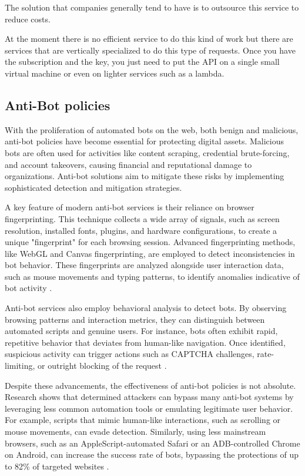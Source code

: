The solution that companies generally tend to have is to outsource this service to reduce costs.

At the moment there is no efficient service to do this kind of work but there are services that are vertically specialized to do this type of requests. Once you have the subscription and the key, you just need to put the API on a single small virtual machine or even on lighter services such as a lambda.

\clearpage

\subsection{Anti-Bot policies}


With the proliferation of automated bots on the web, both benign and malicious, anti-bot policies have become essential for protecting digital assets. Malicious bots are often used for activities like content scraping, credential brute-forcing, and account takeovers, causing financial and reputational damage to organizations. Anti-bot solutions aim to mitigate these risks by implementing sophisticated detection and mitigation strategies.

A key feature of modern anti-bot services is their reliance on browser fingerprinting. This technique collects a wide array of signals, such as screen resolution, installed fonts, plugins, and hardware configurations, to create a unique "fingerprint" for each browsing session. Advanced fingerprinting methods, like WebGL and Canvas fingerprinting, are employed to detect inconsistencies in bot behavior. These fingerprints are analyzed alongside user interaction data, such as mouse movements and typing patterns, to identify anomalies indicative of bot activity \cite{azad2020}.

Anti-bot services also employ behavioral analysis to detect bots. By observing browsing patterns and interaction metrics, they can distinguish between automated scripts and genuine users. For instance, bots often exhibit rapid, repetitive behavior that deviates from human-like navigation. Once identified, suspicious activity can trigger actions such as CAPTCHA challenges, rate-limiting, or outright blocking of the request \cite{azad2020}.

Despite these advancements, the effectiveness of anti-bot policies is not absolute. Research shows that determined attackers can bypass many anti-bot systems by leveraging less common automation tools or emulating legitimate user behavior. For example, scripts that mimic human-like interactions, such as scrolling or mouse movements, can evade detection. Similarly, using less mainstream browsers, such as an AppleScript-automated Safari or an ADB-controlled Chrome on Android, can increase the success rate of bots, bypassing the protections of up to 82\% of targeted websites \cite{azad2020}.

